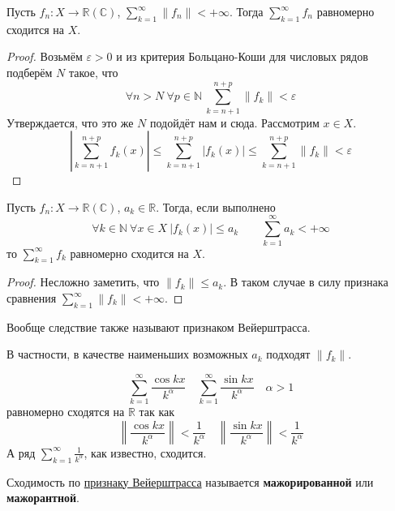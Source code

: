 \documentclass{article}
\let\eps\varepsilon
\begin{document}
    \begin{theorem}
        \label{Признак Вейерштрасса}
        Пусть $f_n\colon X\to\mathbb R(\mathbb C)$, $\sum\limits_{k=1}^\infty\|f_n\|<+\infty$. Тогда $\sum\limits_{k=1}^\infty f_n$ равномерно сходится на $X$.
    \end{theorem}
    \begin{proof}
        Возьмём $\eps>0$ и из критерия Больцано-Коши для числовых рядов подберём $N$ такое, что
        $$
        \forall n>N~\forall p\in\mathbb N~\sum\limits_{k=n+1}^{n+p}\|f_k\|<\eps
        $$
        Утверждается, что это же $N$ подойдёт нам и сюда. Рассмотрим $x\in X$.
        $$
        \left|\sum\limits_{k=n+1}^{n+p}f_k(x)\right|\leqslant\sum\limits_{k=n+1}^{n+p}|f_k(x)|\leqslant\sum\limits_{k=n+1}^{n+p}\|f_k\|<\eps
        $$
    \end{proof}
    \begin{corollary}
        Пусть $f_n\colon X\to\mathbb R(\mathbb C)$, $a_k\in\mathbb R$. Тогда, если выполнено
        $$
        \forall k\in\mathbb N~\forall x\in X~|f_k(x)|\leqslant a_k\qquad\sum\limits_{k=1}^\infty a_k<+\infty
        $$
        то $\sum\limits_{k=1}^\infty f_k$ равномерно сходится на $X$.
    \end{corollary}
    \begin{proof}
        Несложно заметить, что $\|f_k\|\leqslant a_k$. В таком случае в силу признака сравнения $\sum\limits_{k=1}^\infty\|f_k\|<+\infty$.
    \end{proof}
    \begin{remark}
        Вообще следствие также называют признаком Вейерштрасса.
    \end{remark}
    \begin{remark}
        В частности, в качестве наименьших возможных $a_k$ подходят $\|f_k\|$.
    \end{remark}
    \begin{example}
        $$\sum\limits_{k=1}^\infty\frac{\cos kx}{k^\alpha}\quad \sum\limits_{k=1}^\infty\frac{\sin kx}{k^\alpha}\quad\alpha>1$$
        равномерно сходятся на $\mathbb R$ так как
        $$
        \left\|\frac{\cos kx}{k^\alpha}\right\|<\frac1{k^\alpha}\quad\left\|\frac{\sin kx}{k^\alpha}\right\|<\frac1{k^\alpha}
        $$
        А ряд $\sum\limits_{k=1}^\infty\frac1{k^\alpha}$, как известно, сходится.
    \end{example}
    \begin{definition}
        Сходимость по \hyperref[Признак Вейерштрасса]{признаку Вейерштрасса} называется \textbf{мажорированной} или \textbf{мажорантной}.
    \end{definition}
\end{document}
